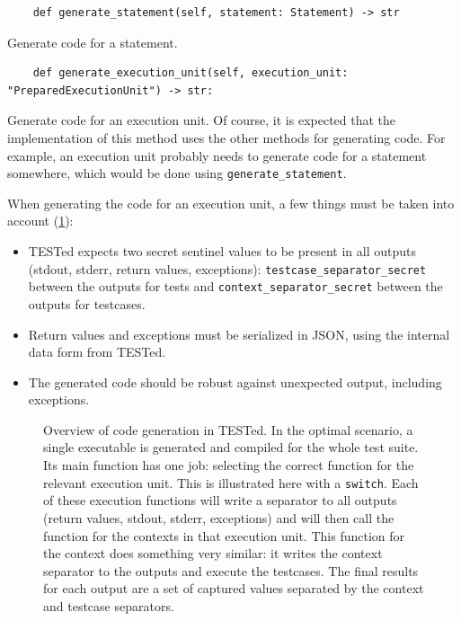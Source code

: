 \documentclass[../main]{subfiles}
\begin{document}
\begin{verbatim}
    def generate_statement(self, statement: Statement) -> str
\end{verbatim}

Generate code for a statement.

\begin{verbatim}
    def generate_execution_unit(self, execution_unit: "PreparedExecutionUnit") -> str:
\end{verbatim}

Generate code for an execution unit.
Of course, it is expected that the implementation of this method uses the other methods for generating code.
For example, an execution unit probably needs to generate code for a statement somewhere, which would be done using \texttt{generate_statement}.

When generating the code for an execution unit, a few things must be taken into account (\cref{fig:generated-code}):

\begin{itemize}
    \item TESTed expects two secret sentinel values to be present in all outputs (stdout, stderr, return values, exceptions): \texttt{testcase\_separator\_secret} between the outputs for tests and \texttt{context\_separator\_secret} between the outputs for testcases.
    \item Return values and exceptions must be serialized in JSON, using the internal data form from TESTed.
    \item The generated code should be robust against unexpected output, including exceptions.
\end{itemize}

\begin{figure}
    \centering
    
    \caption{Overview of code generation in TESTed.
        In the optimal scenario, a single executable is generated and compiled for the whole test suite.
        Its main function has one job: selecting the correct function for the relevant execution unit.
        This is illustrated here with a \texttt{switch}.
        Each of these execution functions will write a separator to all outputs (return values, stdout, stderr, exceptions) and will then call the function for the contexts in that execution unit.
        This function for the context does something very similar: it writes the context separator to the outputs and execute the testcases.
        The final results for each output are a set of captured values separated by the context and testcase separators.
    }
    \label{fig:generated-code}
\end{figure}
\end{document}
